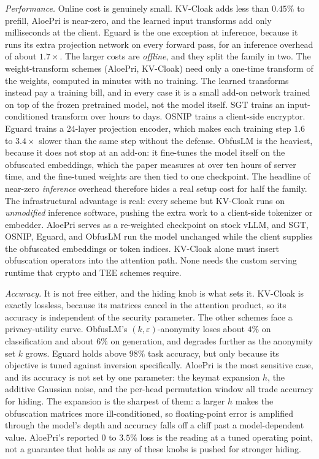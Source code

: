 \emph{Performance.} Online cost is genuinely small. KV-Cloak adds less than $0.45\%$ to
prefill, AloePri is near-zero, and the learned input transforms add only milliseconds
at the client. Eguard is the one exception at inference, because it runs its extra projection
network on every forward pass, for an inference overhead of about $1.7\times$. The larger
costs are \emph{offline}, and they split the family in two. The weight-transform schemes
(AloePri, KV-Cloak) need only a one-time transform of the weights, computed in minutes
with no training. The learned transforms instead pay a training bill, and in every case it is
a small add-on network trained on top of the frozen pretrained model, not the model itself.
SGT trains an input-conditioned transform over hours to days. OSNIP trains a client-side
encryptor. Eguard trains a 24-layer projection encoder, which makes each training step $1.6$
to $3.4\times$ slower than the same step without the defense. ObfusLM is the heaviest,
because it does not stop at an add-on: it fine-tunes the model itself on the obfuscated
embeddings, which the paper measures at over ten hours of server time, and the fine-tuned
weights are then tied to one checkpoint. The headline of near-zero \emph{inference} overhead
therefore hides a real setup cost for half the family. The infrastructural advantage is
real: every scheme but KV-Cloak runs on \emph{unmodified} inference software, pushing the
extra work to a client-side tokenizer or embedder. AloePri serves as a re-weighted checkpoint
on stock vLLM, and SGT, OSNIP, Eguard, and ObfusLM run the model unchanged while the client
supplies the obfuscated embeddings or token indices. KV-Cloak alone must insert obfuscation
operators into the attention path. None needs the custom serving runtime that crypto and TEE
schemes require.

\emph{Accuracy.} It is not free either, and the hiding knob is what sets it. KV-Cloak
is exactly lossless, because its matrices cancel in the attention product, so its accuracy is
independent of the security parameter. The other schemes face a privacy-utility curve. ObfusLM's $(k,\varepsilon)$-anonymity loses about $4\%$ on classification and about
$6\%$ on generation, and degrades further as the anonymity set $k$ grows. Eguard holds above
$98\%$ task accuracy, but only because its objective is tuned against inversion specifically.
AloePri is the most sensitive case, and its accuracy is not set by one parameter: the keymat
expansion $h$, the additive Gaussian noise, and the per-head permutation window all trade
accuracy for hiding. The expansion is the sharpest of them: a larger $h$ makes the obfuscation
matrices more ill-conditioned, so floating-point error is amplified through the model's depth
and accuracy falls off a cliff past a model-dependent value. AloePri's reported $0$ to $3.5\%$
loss is the reading at a tuned operating point, not a guarantee that holds as any of these
knobs is pushed for stronger hiding.

